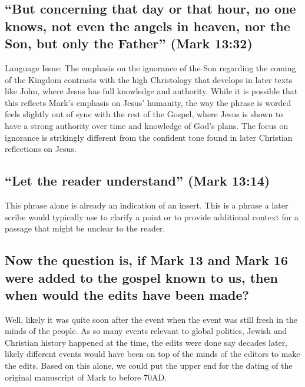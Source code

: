 \subsection{``But concerning that day or that hour, no one knows, not even the angels in heaven, nor the Son, but only the Father'' (Mark 13:32)}\label{subsec:but-concerning-that-day-or-that-hour-no-one-knows-not-even-the-angels-in-heaven-nor-the-son-but-only-the-father-mark-1332}

Language Issue: The emphasis on the ignorance of the Son regarding the coming of the Kingdom contrasts with the high Christology that develops in later texts like John, where Jesus has full knowledge and authority.
While it is possible that this reflects Mark's emphasis on Jesus' humanity, the way the phrase is worded feels slightly out of sync with the rest of the Gospel, where Jesus is shown to have a strong authority over time and knowledge of God's plans.
The focus on ignorance is strikingly different from the confident tone found in later Christian reflections on Jesus.

\subsection{``Let the reader understand'' (Mark 13:14)}\label{subsec:let-the-reader-understand-mark-1314}

This phrase alone is already an indication of an insert.
This is a phrase a later scribe would typically use to clarify a point or to provide additional context for a passage that might be unclear to the reader.

\subsection{Now the question is, if Mark 13 and Mark 16 were added to the gospel known to us, then when would the edits have been made?}\label{subsec:now-the-question-is-if-mark-13-and-mark-16-were-added-to-the-gospel-known-to-us-then-when-would-the-edits-have-been-made}

Well, likely it was quite soon after the event when the event was still fresh in the minds of the people.
As so many events relevant to global politics, Jewish and Christian history happened at the time, the edits were done say decades later, likely different events would have been on top of the minds of the editors to make the edits.
Based on this alone, we could put the upper end for the dating of the original manuscript of Mark to before 70AD.

